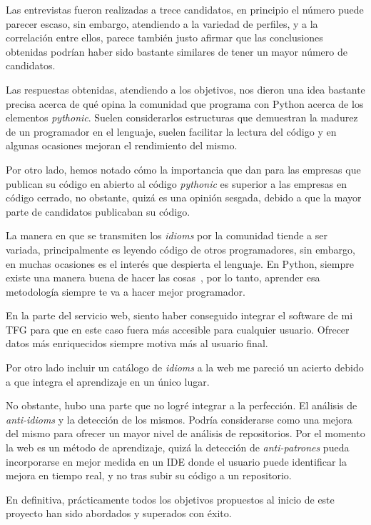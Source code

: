 \documentclass[a4paper, 12pt]{book}
\begin{document}
Las entrevistas fueron realizadas a trece candidatos, en principio el número puede parecer escaso, sin embargo, atendiendo a la variedad de perfiles, y a la correlación entre ellos, parece también justo afirmar que las conclusiones obtenidas podrían haber sido bastante similares de tener un mayor número de candidatos.

Las respuestas obtenidas, atendiendo a los objetivos, nos dieron una idea bastante precisa acerca de qué opina la comunidad que programa con Python acerca de los elementos \textit{pythonic}. Suelen considerarlos estructuras que demuestran la madurez de un programador en el lenguaje, suelen facilitar la lectura del código y en algunas ocasiones mejoran el rendimiento del mismo.

Por otro lado, hemos notado cómo la importancia que dan para las empresas que publican su código en abierto al código \textit{pythonic} es superior a las empresas en código cerrado, no obstante, quizá es una opinión sesgada, debido a que la mayor parte de candidatos publicaban su código.

La manera en que se transmiten los \textit{idioms} por la comunidad tiende a ser variada, principalmente es leyendo código de otros programadores, sin embargo, en muchas ocasiones es el interés que despierta el lenguaje. En Python, siempre existe una manera buena de hacer las cosas~\cite{peters2010zen}, por lo tanto, aprender esa metodología siempre te va a hacer mejor programador.

En la parte del servicio web, siento haber conseguido integrar el software de mi TFG para que en este caso fuera más accesible para cualquier usuario. Ofrecer datos más enriquecidos siempre motiva más al usuario final.

Por otro lado incluir un catálogo de \textit{idioms} a la web me pareció un acierto debido a que integra el aprendizaje en un único lugar.

No obstante, hubo una parte que no logré integrar a la perfección. El análisis de \textit{anti-idioms} y la detección de los mismos. Podría considerarse como una mejora del mismo para ofrecer un mayor nivel de análisis de repositorios. Por el momento la web es un método de aprendizaje, quizá la detección de \textit{anti-patrones} pueda incorporarse en mejor medida en un IDE donde el usuario puede identificar la mejora en tiempo real, y no tras subir su código a un repositorio.

En definitiva, prácticamente todos los objetivos propuestos al inicio de este proyecto han sido abordados y superados con éxito.
\end{document}
